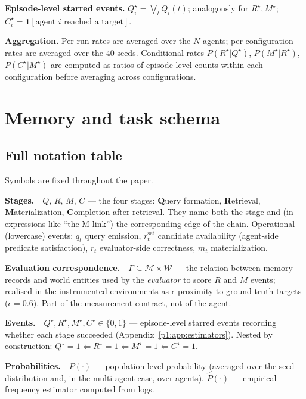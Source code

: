 \documentclass{article}
\begin{document}
\textbf{Episode-level starred events.} $Q^\star_i = \bigvee_t Q_i(t)$; analogously for $R^\star, M^\star$; $C^\star_i = \mathbf{1}[\text{agent } i \text{ reached a target}]$.

\textbf{Aggregation.} Per-run rates are averaged over the $N$ agents; per-configuration rates are averaged over the 40 seeds. Conditional rates $P(R^\star|Q^\star)$, $P(M^\star|R^\star)$, $P(C^\star|M^\star)$ are computed as ratios of episode-level counts within each configuration before averaging across configurations.

\section{Memory and task schema}
\label{p1:app:schemas}

\subsection{Full notation table}
\label{p1:app:notation}

Symbols are fixed throughout the paper.

\newcommand{\notentry}[1]{\par\smallskip\noindent\textbf{#1}\ \ }

\notentry{Stages.}$Q$, $R$, $M$, $C$ --- the four stages: \textbf{Q}uery formation, \textbf{R}etrieval, \textbf{M}aterialization, \textbf{C}ompletion after retrieval. They name both the stage and (in expressions like ``the M link'') the corresponding edge of the chain. Operational (lowercase) events: $q_t$ query emission, $r^{\mathrm{set}}_t$ candidate availability (agent-side predicate satisfaction), $r_t$ evaluator-side correctness, $m_t$ materialization.

\notentry{Evaluation correspondence.}$\Gamma \subseteq \mathcal{M} \times \mathcal{W}$ --- the relation between memory records and world entities used by the \emph{evaluator} to score $R$ and $M$ events; realised in the instrumented environments as $\epsilon$-proximity to ground-truth targets ($\epsilon{=}0.6$). Part of the measurement contract, not of the agent.

\notentry{Events.}$Q^\star, R^\star, M^\star, C^\star \in \{0, 1\}$ --- episode-level starred events recording whether each stage succeeded (Appendix~\ref{p1:app:estimators}). Nested by construction: $Q^\star{=}1 \Leftarrow R^\star{=}1 \Leftarrow M^\star{=}1 \Leftarrow C^\star{=}1$.

\notentry{Probabilities.}$P(\cdot)$ --- population-level probability (averaged over the seed distribution and, in the multi-agent case, over agents). $\hat{P}(\cdot)$ --- empirical-frequency estimator computed from logs.
\end{document}
